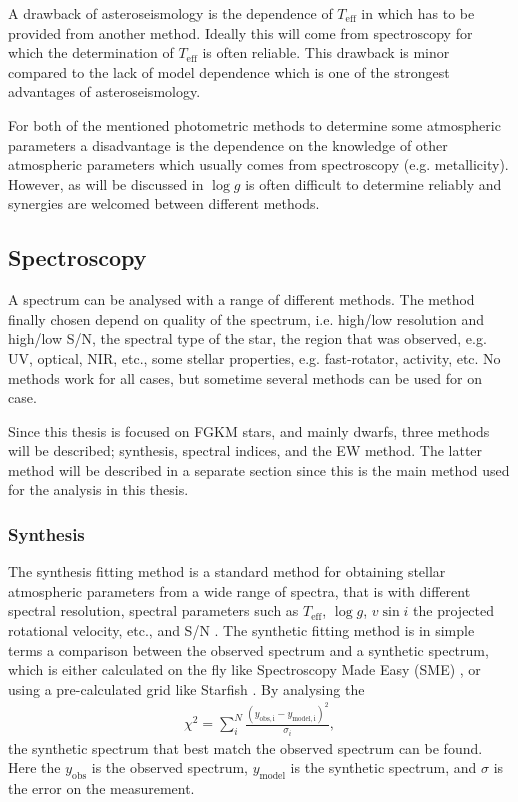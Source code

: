 A drawback of asteroseismology is the dependence of $T_\mathrm{eff}$ in
 which has to be provided from another method. Ideally this
will come from spectroscopy for which the determination of $T_\mathrm{eff}$ is
often reliable. This drawback is minor compared to the lack of model dependence
which is one of the strongest advantages of asteroseismology.

For both of the mentioned photometric methods to determine some atmospheric
parameters a disadvantage is the dependence on the knowledge of other
atmospheric parameters which usually comes from spectroscopy (e.g. metallicity).
However, as will be discussed in  $\log g$ is
often difficult to determine reliably and synergies are welcomed between
different methods.

\subsection{Spectroscopy}
\label{sec:method_spectroscopy}

A spectrum can be analysed with a range of different methods. The method finally
chosen depend on quality of the spectrum, i.e. high/low resolution and high/low
S/N, the spectral type of the star, the region that was observed, e.g. UV,
optical, NIR, etc., some stellar properties, e.g. fast-rotator, activity, etc.
No methods work for all cases, but sometime several methods can be used for on
case.

Since this thesis is focused on FGKM stars, and mainly dwarfs, three methods
will be described; synthesis, spectral indices, and the EW method. The latter
method will be described in a separate section since this is the main method
used for the analysis in this thesis.



\subsubsection{Synthesis}
\label{sec:synthesis}

The synthesis fitting method is a standard method for obtaining stellar
atmospheric parameters from a wide range of spectra, that is with different
spectral resolution, spectral parameters such as $T_\mathrm{eff}$, $\log g$,
$v\sin i$ the projected rotational velocity, etc., and S/N  \citep[see
e.g.][]{Tsantaki2017}. The synthetic fitting method is in simple terms a
comparison between the observed spectrum and a synthetic spectrum, which is
either calculated on the fly like Spectroscopy Made Easy (SME)
\citep{Valenti1996}, or using a pre-calculated grid like Starfish
\citep{Czekala2015}. By analysing the
\begin{align}
  \chi^2 = \sum_i^N\frac{(y_\mathrm{obs,i}-y_\mathrm{model,i})^2}{\sigma_i},
\end{align}
the synthetic spectrum that best match the observed spectrum can be found. Here
the $y_\mathrm{obs}$ is the observed spectrum, $y_\mathrm{model}$ is the
synthetic spectrum, and $\sigma$ is the error on the measurement.


